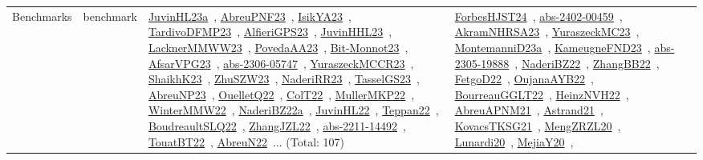 {\begin{longtable}{lp{3cm}>{\raggedright\arraybackslash}p{6cm}>{\raggedright\arraybackslash}p{6cm}>{\raggedright\arraybackslash}p{8cm}}
Benchmarks & benchmark & \href{../works/JuvinHL23a.pdf}{JuvinHL23a}~\cite{JuvinHL23a}, \href{../works/AbreuPNF23.pdf}{AbreuPNF23}~\cite{AbreuPNF23}, \href{../works/IsikYA23.pdf}{IsikYA23}~\cite{IsikYA23}, \href{../works/TardivoDFMP23.pdf}{TardivoDFMP23}~\cite{TardivoDFMP23}, \href{../works/AlfieriGPS23.pdf}{AlfieriGPS23}~\cite{AlfieriGPS23}, \href{../works/JuvinHHL23.pdf}{JuvinHHL23}~\cite{JuvinHHL23}, \href{../works/LacknerMMWW23.pdf}{LacknerMMWW23}~\cite{LacknerMMWW23}, \href{../works/PovedaAA23.pdf}{PovedaAA23}~\cite{PovedaAA23}, \href{../works/Bit-Monnot23.pdf}{Bit-Monnot23}~\cite{Bit-Monnot23}, \href{../works/AfsarVPG23.pdf}{AfsarVPG23}~\cite{AfsarVPG23}, \href{../works/abs-2306-05747.pdf}{abs-2306-05747}~\cite{abs-2306-05747}, \href{../works/YuraszeckMCCR23.pdf}{YuraszeckMCCR23}~\cite{YuraszeckMCCR23}, \href{../works/ShaikhK23.pdf}{ShaikhK23}~\cite{ShaikhK23}, \href{../works/ZhuSZW23.pdf}{ZhuSZW23}~\cite{ZhuSZW23}, \href{../works/NaderiRR23.pdf}{NaderiRR23}~\cite{NaderiRR23}, \href{../works/TasselGS23.pdf}{TasselGS23}~\cite{TasselGS23}, \href{../works/AbreuNP23.pdf}{AbreuNP23}~\cite{AbreuNP23}, \href{../works/OuelletQ22.pdf}{OuelletQ22}~\cite{OuelletQ22}, \href{../works/ColT22.pdf}{ColT22}~\cite{ColT22}, \href{../works/MullerMKP22.pdf}{MullerMKP22}~\cite{MullerMKP22}, \href{../works/WinterMMW22.pdf}{WinterMMW22}~\cite{WinterMMW22}, \href{../works/NaderiBZ22a.pdf}{NaderiBZ22a}~\cite{NaderiBZ22a}, \href{../works/JuvinHL22.pdf}{JuvinHL22}~\cite{JuvinHL22}, \href{../works/Teppan22.pdf}{Teppan22}~\cite{Teppan22}, \href{../works/BoudreaultSLQ22.pdf}{BoudreaultSLQ22}~\cite{BoudreaultSLQ22}, \href{../works/ZhangJZL22.pdf}{ZhangJZL22}~\cite{ZhangJZL22}, \href{../works/abs-2211-14492.pdf}{abs-2211-14492}~\cite{abs-2211-14492}, \href{../works/TouatBT22.pdf}{TouatBT22}~\cite{TouatBT22}, \href{../works/AbreuN22.pdf}{AbreuN22}~\cite{AbreuN22}... (Total: 107) & \href{../works/ForbesHJST24.pdf}{ForbesHJST24}~\cite{ForbesHJST24}, \href{../works/abs-2402-00459.pdf}{abs-2402-00459}~\cite{abs-2402-00459}, \href{../works/AkramNHRSA23.pdf}{AkramNHRSA23}~\cite{AkramNHRSA23}, \href{../works/YuraszeckMC23.pdf}{YuraszeckMC23}~\cite{YuraszeckMC23}, \href{../works/MontemanniD23a.pdf}{MontemanniD23a}~\cite{MontemanniD23a}, \href{../works/KameugneFND23.pdf}{KameugneFND23}~\cite{KameugneFND23}, \href{../works/abs-2305-19888.pdf}{abs-2305-19888}~\cite{abs-2305-19888}, \href{../works/NaderiBZ22.pdf}{NaderiBZ22}~\cite{NaderiBZ22}, \href{../works/ZhangBB22.pdf}{ZhangBB22}~\cite{ZhangBB22}, \href{../works/FetgoD22.pdf}{FetgoD22}~\cite{FetgoD22}, \href{../works/OujanaAYB22.pdf}{OujanaAYB22}~\cite{OujanaAYB22}, \href{../works/BourreauGGLT22.pdf}{BourreauGGLT22}~\cite{BourreauGGLT22}, \href{../works/HeinzNVH22.pdf}{HeinzNVH22}~\cite{HeinzNVH22}, \href{../works/AbreuAPNM21.pdf}{AbreuAPNM21}~\cite{AbreuAPNM21}, \href{../works/Astrand21.pdf}{Astrand21}~\cite{Astrand21}, \href{../works/KovacsTKSG21.pdf}{KovacsTKSG21}~\cite{KovacsTKSG21}, \href{../works/MengZRZL20.pdf}{MengZRZL20}~\cite{MengZRZL20}, \href{../works/Lunardi20.pdf}{Lunardi20}~\cite{Lunardi20}, \href{../works/MejiaY20.pdf}{MejiaY20}~\cite{MejiaY20}, 
\end{longtable}}
